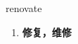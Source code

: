 
\begin{frame}
{\huge renovate}
\begin{center}
\begin{enumerate}\Large
  \item \textbf{修复，维修}
\end{enumerate}
\end{center}
\end{frame}

